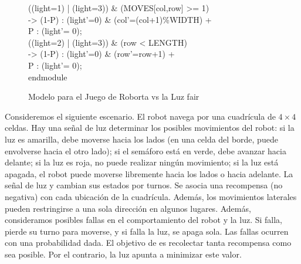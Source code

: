 \begin{figure}[t]
\begin{minipage}[t]{.47\textwidth}
{\begin{tabbing}
\>[r\_r] ((light=1) | (light=3)) \& (MOVES[col,row] >= 1)\\
\>                    \>\>-> \> (1-P) : (light'=0) \& (col'=(col+1)\%WIDTH) + \\
\>                     \>\>\> P : (light'= 0); \\[1ex]
\>[r\_f] ((light=2) | (light=3)) \& (row < LENGTH) \\
\>                    \>\>-> \> (1-P) : (light'=0) \& (row'=row+1)  + \\
\>                     \>\>\> P : (light'= 0);\\[1ex]
endmodule\\[-5ex]
\end{tabbing}}
\end{minipage}
\vspace{0.5cm}
\caption{Modelo para el Juego de Roborta vs la Luz fair} \label{fig:robot_game_model}
\end{figure}

Consideremos el siguiente escenario. El robot \roborta navega por una cuadrícula de $4 \times 4$ celdas. Hay una señal de luz
determinar los posibles movimientos del robot: si la luz es amarilla, debe moverse hacia los lados (en una celda del borde, \roborta puede envolverse hacia el otro lado); si el semáforo está en verde, debe avanzar hacia delante; si la luz es roja, no puede realizar ningún movimiento; si la luz está apagada, el robot puede moverse libremente hacia los lados o hacia adelante. La señal de luz y \roborta cambian sus estados por turnos. Se asocia una recompensa (no negativa) con cada ubicación de la cuadrícula. Además, los movimientos laterales pueden restringirse a una sola dirección en algunos lugares.
Además, consideramos posibles fallas en el comportamiento del robot y la luz. Si \roborta falla, pierde su turno para moverse, y si falla la luz, se apaga sola. Las fallas ocurren con una probabilidad dada. El objetivo de \roborta es recolectar tanta recompensa como sea posible. Por el contrario, la luz apunta a minimizar este valor.

